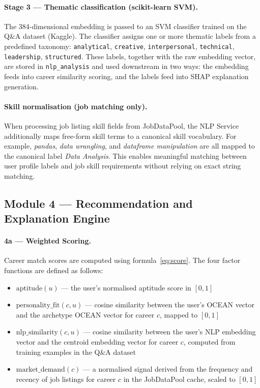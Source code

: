 \paragraph{Stage 3 --- Thematic classification (scikit-learn SVM).}
The 384-dimensional embedding is passed to an SVM classifier trained on the
Q\&A dataset (Kaggle). The classifier assigns one or more thematic labels from
a predefined taxonomy: \texttt{analytical}, \texttt{creative},
\texttt{interpersonal}, \texttt{technical}, \texttt{leadership},
\texttt{structured}. These labels, together with the raw embedding vector, are
stored in \texttt{nlp\_analysis} and used downstream in two ways: the embedding
feeds into career similarity scoring, and the labels feed into SHAP explanation
generation.

\paragraph{Skill normalisation (job matching only).}
When processing job listing skill fields from JobDataPool, the NLP Service
additionally maps free-form skill terms to a canonical skill vocabulary. For
example, \emph{pandas}, \emph{data wrangling}, and \emph{dataframe
manipulation} are all mapped to the canonical label \emph{Data Analysis}. This
enables meaningful matching between user profile labels and job skill
requirements without relying on exact string matching.

\subsection*{Module 4 --- Recommendation and Explanation Engine}

\paragraph{4a --- Weighted Scoring.}
Career match scores are computed using formula~\eqref{eq:score}. The four
factor functions are defined as follows:

\begin{itemize}
  \item $\text{aptitude}(u)$ --- the user's normalised aptitude score in
        $[0, 1]$
  \item $\text{personality\_fit}(c, u)$ --- cosine similarity between the
        user's OCEAN vector and the archetype OCEAN vector for career $c$,
        mapped to $[0, 1]$
  \item $\text{nlp\_similarity}(c, u)$ --- cosine similarity between the
        user's NLP embedding vector and the centroid embedding vector for
        career $c$, computed from training examples in the Q\&A dataset
  \item $\text{market\_demand}(c)$ --- a normalised signal derived from the
        frequency and recency of job listings for career $c$ in the
        JobDataPool cache, scaled to $[0, 1]$
\end{itemize}

